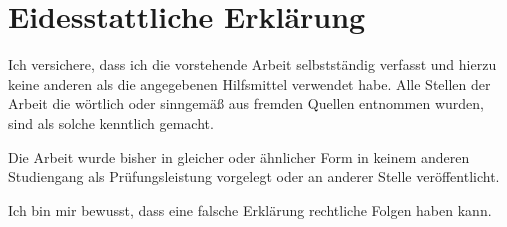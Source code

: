 \section*{Eidesstattliche Erklärung}\label{eidesstattliche-erkluxe4rung}

Ich versichere, dass ich die vorstehende Arbeit selbstständig verfasst
und hierzu keine anderen als die angegebenen Hilfsmittel verwendet habe.
Alle Stellen der Arbeit die wörtlich oder sinngemäß aus fremden Quellen
entnommen wurden, sind als solche kenntlich gemacht.

Die Arbeit wurde bisher in gleicher oder ähnlicher Form in keinem
anderen Studiengang als Prüfungsleistung vorgelegt oder an anderer
Stelle veröffentlicht.

Ich bin mir bewusst, dass eine falsche Erklärung rechtliche Folgen haben
kann.

